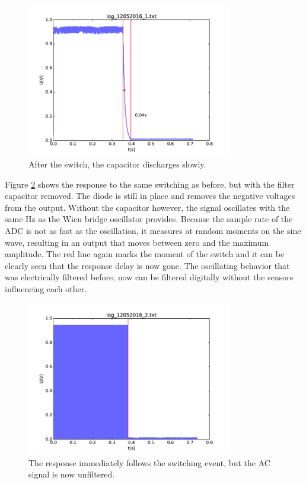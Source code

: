 \begin{figure}
	\begin{center}
		\includegraphics[width=0.8\textwidth]{images/switch_cap.pdf} 
		\caption{After the switch, the capacitor discharges slowly.}
		\label{fig:swcap}
	\end{center}
\end{figure}

Figure \ref{fig:swnocap} shows the response to the same switching as before, but with the filter capacitor removed. The diode is still in place and removes the negative voltages from the output. Without the capacitor however, the signal oscillates with the same \unit[1666]{Hz} as the Wien bridge oscillator provides. Because the sample rate of the ADC is not as fast as the oscillation, it measures at random moments on the sine wave, resulting in an output that moves between zero and the maximum amplitude. The red line again marks the moment of the switch and it can be clearly seen that the response delay is now gone. The oscillating behavior that was electrically filtered before, now can be filtered digitally without the sensors influencing each other.

\begin{figure}
	\begin{center}
		\includegraphics[width=0.8\textwidth]{images/switch_nocap.pdf} 
		\caption{The response immediately follows the switching event, but the AC signal is now unfiltered.}
		\label{fig:swnocap}
	\end{center}
\end{figure}

